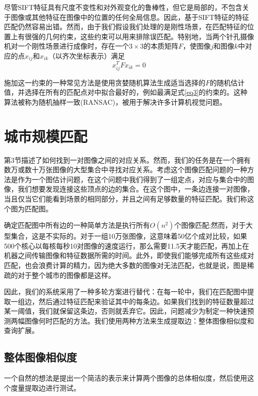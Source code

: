 \begin{translation}
尽管SIFT特征具有尺度不变性和对外观变化的鲁棒性，但它是局部的，不包含关于图像或其他特征在图像中的位置的任何全局信息。因此，基于SIFT特征的特征匹配仍然容易出错。然而，由于我们假设我们处理的是刚性场景，在匹配特征的位置上有很强的几何约束，这些约束可以用来排除误匹配。特别地，当两个针孔摄像机对一个刚性场景进行成像时，存在一个$3\times 3$的本质矩阵$F$，使图像$j$和图像$k$中对应的点$x_{ij}$和$x_{ik}$（以齐次坐标表示）满足\cite{andrew2001multiple}
\begin{equation}
	\label{eq3}
	x_{ij}^TFx_{ik}=0
\end{equation}

施加这一约束的一种常见方法是使用贪婪随机算法生成适当选择的$F$的随机估计值，并选择在所有的匹配点对中拟合最好的，例如最满足式\ref{eq3}的约束的。这种算法被称为随机抽样一致(RANSAC)\cite{fischler1981random}，被用于解决许多计算机视觉问题。

\section{城市规模匹配}
\label{sec-4}
第3节描述了如何找到一对图像之间的对应关系。然而，我们的任务是在一个拥有数万或数十万张图像的大型集合中寻找对应关系。考虑这个图像匹配问题的一种方法是作为一个图估计问题，在这个问题中我们得到了一组定点，对应与集合中的图像，我们想要发现连接这些顶点的边的集合。在这个图中，一条边连接一对图像，当且仅当它们能看到场景的相同部分，并且之间有足够数量的特征匹配。我们称这个图为匹配图。

确定匹配图中所有边的一种简单方法是执行所有$O(n^2)$个图像匹配;然而，对于大型集合，这是不实际的。对于一组10万张图像，这意味着50亿个成对比较，如果500个核心以每核每秒10对图像的速度运行，那么需要11.5天才能匹配，再加上在机器之间传输图像和特征数据所需的时间。此外，即使我们能够完成所有这些成对匹配，也会浪费计算的精力，因为绝大多数的图像对无法匹配，也就是说，图是稀疏的对于整个城市的图像都是这样。

因此，我们的系统采用了一种多轮方案进行替代：在每一轮中，我们在匹配图中提取一组边，然后通过特征匹配来验证其中的每条边。如果我们找到的特征数量超过某一阈值，我们就保留这条边，否则就丢弃它。因此，问题减少为制定一种快速预测两幅图像何时匹配的方法。我们使用两种方法来生成提取边：整体图像相似度和查询扩展。

\subsection{整体图像相似度}
\label{sec-4-1}
一个自然的想法是提出一个简洁的表示来计算两个图像的总体相似度，然后使用这个度量提取边进行测试。


\end{translation}
